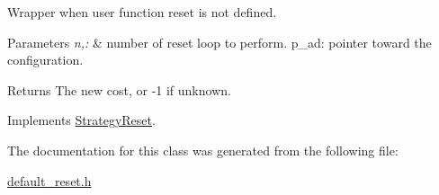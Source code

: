 \-Wrapper when user function reset is not defined. 


\begin{DoxyParams}{\-Parameters}
{\em n,\-:} & number of reset loop to perform. p\-\_\-ad\-: pointer toward the configuration. \\
\hline
\end{DoxyParams}
\begin{DoxyReturn}{\-Returns}
\-The new cost, or -\/1 if unknown. 
\end{DoxyReturn}


\-Implements \hyperlink{classStrategyReset_af6cedf730c45825c61390455bd6f90a4}{\-Strategy\-Reset}.



\-The documentation for this class was generated from the following file\-:\begin{DoxyCompactItemize}
\item 
\hyperlink{default__reset_8h}{default\-\_\-reset.\-h}\end{DoxyCompactItemize}

